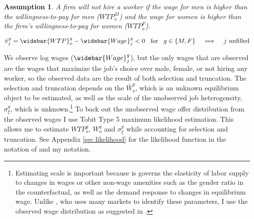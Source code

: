 \documentclass[12pt]{article}
\newtheorem{assumption}{Assumption}
\begin{document}


\begin{assumption}
A firm will not hire a worker if the wage for men is higher than the willingness-to-pay for men ($WTP^M_o$) and the wage for women is higher than the firm's willingness-to-pay for women ($WTP^F_o$).
\end{assumption}

$$ \bar{\pi}^g_j = \widebar{WTP}^g_o - \widebar{Wage}^g_j <  0 \hspace{3mm} \text{for} \hspace{3mm} g \in \{M,F\}  \hspace{3mm} \implies \hspace{3mm} \text{$j$ unfilled}$$



We observe log wages ($\widebar{Wage}^g_j$), but the only wages that are observed are the wages that maximize the job's choice over male, female, or not hiring any worker, so the observed data are the result of both selection and truncation. The selection and truncation depends on the $\bar{W}^g_o$, which is an unknown equilibrium object to be estimated, as well as the scale of the unobserved job heterogeneity, $\sigma^g_\xi $, which is unknown.\footnote{Estimating scale is important because is governs the elasticity of labor supply to changes in wages or other non-wage amenities such as the gender ratio in the counterfactual, as well as the demand response to changes in equilibrium wage. Unlike , who uses many markets to identify these parameters, I use the observed wage distribution as suggested in .} To back out the unobserved wage offer distribution from the observed wages I use Tobit Type 5 maximum likelihood estimation. This allows me to estimate $WTP^g_o$, $W^g_o$ and $\sigma^g_{\xi}$ while accounting for selection and truncation. See Appendix \ref{sec.likelihood} for the likelihood function in the notation of  and my notation.
\end{document}
